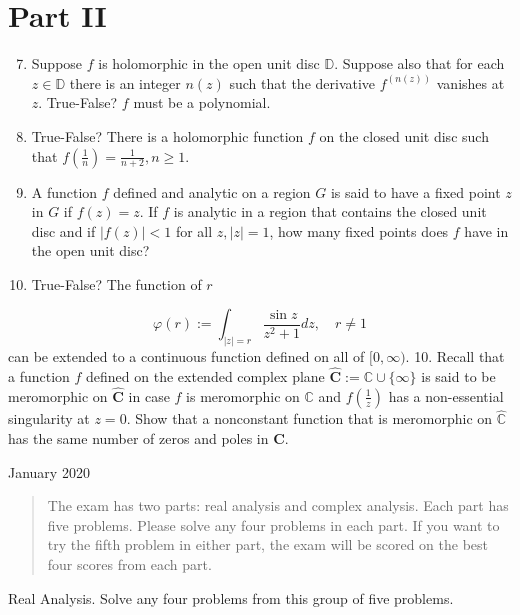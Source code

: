 \documentclass[10pt]{article}
\begin{document}
\section{Part II}
\begin{enumerate}
  \setcounter{enumi}{6}
  \item Suppose $f$ is holomorphic in the open unit disc $\mathbb{D}$. Suppose also that for each $z \in \mathbb{D}$ there is an integer $n(z)$ such that the derivative $f^{(n(z))}$ vanishes at $z$. True-False? $f$ must be a polynomial.

  \item True-False? There is a holomorphic function $f$ on the closed unit disc such that $f\left(\frac{1}{n}\right)=\frac{1}{n+2}, n \geq 1$.

  \item A function $f$ defined and analytic on a region $G$ is said to have a fixed point $z$ in $G$ if $f(z)=z$. If $f$ is analytic in a region that contains the closed unit disc and if $|f(z)|<1$ for all $z,|z|=1$, how many fixed points does $f$ have in the open unit disc?

  \item True-False? The function of $r$

\end{enumerate}
$$
\varphi(r):=\int_{|z|=r} \frac{\sin z}{z^{2}+1} d z, \quad r \neq 1
$$
can be extended to a continuous function defined on all of $[0, \infty)$. 10. Recall that a function $f$ defined on the extended complex plane $\widehat{\mathbf{C}}:=\mathbb{C} \cup\{\infty\}$ is said to be meromorphic on $\widehat{\mathbf{C}}$ in case $f$ is meromorphic on $\mathbb{C}$ and $f\left(\frac{1}{z}\right)$ has a non-essential singularity at $z=0$. Show that a nonconstant function that is meromorphic on $\widehat{\mathbb{C}}$ has the same number of zeros and poles in $\widehat{\mathbf{C}}$.

January 2020

\begin{abstract}
The exam has two parts: real analysis and complex analysis. Each part has five problems. Please solve any four problems in each part. 
 If you want to try the fifth problem in either part, the exam will be scored on the best four scores from each part.
\end{abstract}

Real Analysis. Solve any four problems from this group of five problems.
\end{document}
